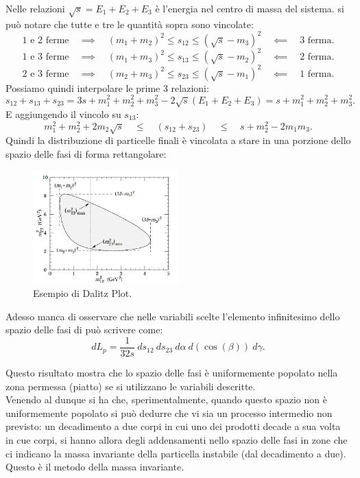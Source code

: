 Nelle relazioni $\sqrt{s}= E_1+E_2+E_3$ è l'energia nel centro di massa del sistema. si può notare che tutte e tre le quantità sopra sono vincolate:
\[
	\text{1 e 2 ferme} \quad \implies \quad \left( m_1 + m_2 \right)^2 \le s_{12} \le \left( \sqrt{s} - m_3 \right)^2 \quad \impliedby \quad \text{3 ferma}  
.\]
\[
	\text{1 e 3 ferme} \quad \implies \quad \left( m_1 + m_3 \right)^2 \le s_{13} \le \left( \sqrt{s} - m_2 \right)^2 \quad \impliedby \quad \text{2 ferma}  
.\] 
\[
	\text{2 e 3 ferme} \quad \implies \quad \left( m_2 + m_3 \right)^2 \le s_{23} \le \left( \sqrt{s} - m_1 \right)^2 \quad \impliedby \quad \text{1 ferma}  
.\] 
Possiamo quindi interpolare le prime 3 relazioni:
\[
	s_{12} + s_{13} + s_{23} = 3s + m_1^2 + m_2^2 + m_3^2 - 2 \sqrt{s}\left( E_1 + E_2 + E_3 \right) = s + m_1^2 + m_2^2 + m_3^2   
.\] 
E aggiungendo il vincolo su $s_{13}$:
\[
	m_1^2 + m_2^2 + 2m_2 \sqrt{s} \quad \le \quad  ( s_{12} + s_{23} ) \quad  \le  \quad  s + m_2^2 - 2m_1 m_3 
.\] 
Quindi la distribuzione di particelle finali è vincolata a stare in una porzione dello spazio delle fasi di forma rettangolare:
\begin{figure}[H]
	\centering
	\includegraphics[width=0.5\textwidth]{immagini/Dalitz.png}
	\caption{Esempio di Dalitz Plot.}
	\label{fig:Dalitz}
\end{figure}
Adesso manca di osservare che nelle variabili scelte l'elemento infinitesimo dello spazio delle fasi di può scrivere come:
\[
	dL_p = \frac{1}{32s} \ ds_{12} \ ds_{23} \ d\alpha \ d\left( \cos(\beta) \right) \ d\gamma 
.\] 

Questo risultato mostra che lo spazio delle fasi è uniformemente popolato nella zona permessa (piatto) se si utilizzano le variabili descritte.\\

Venendo al dunque si ha che, sperimentalmente, quando questo spazio non è uniformemente popolato si può dedurre che vi sia un processo intermedio non previsto: un decadimento a due corpi in cui uno dei prodotti decade a sua volta in cue corpi, si hanno allora degli addensamenti nello spazio delle fasi in zone che ci indicano la massa invariante della particella instabile (dal decadimento a due). Questo è il metodo della massa invariante.



